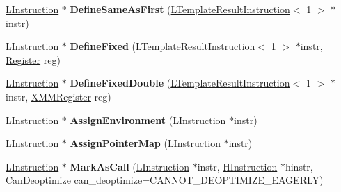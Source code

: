 \begin{DoxyCompactItemize}
\item 
\hyperlink{classv8_1_1internal_1_1_l_instruction}{L\+Instruction} $\ast$ {\bfseries Define\+Same\+As\+First} (\hyperlink{classv8_1_1internal_1_1_l_template_result_instruction}{L\+Template\+Result\+Instruction}$<$ 1 $>$ $\ast$instr)\hypertarget{classv8_1_1internal_1_1_l_chunk_builder_a7a3e6bb64466e8d0b7062311bc13455a}{}\label{classv8_1_1internal_1_1_l_chunk_builder_a7a3e6bb64466e8d0b7062311bc13455a}

\item 
\hyperlink{classv8_1_1internal_1_1_l_instruction}{L\+Instruction} $\ast$ {\bfseries Define\+Fixed} (\hyperlink{classv8_1_1internal_1_1_l_template_result_instruction}{L\+Template\+Result\+Instruction}$<$ 1 $>$ $\ast$instr, \hyperlink{structv8_1_1internal_1_1_register}{Register} reg)\hypertarget{classv8_1_1internal_1_1_l_chunk_builder_a7dfb72b4e8c8ed4fc4acb6c8ce207af9}{}\label{classv8_1_1internal_1_1_l_chunk_builder_a7dfb72b4e8c8ed4fc4acb6c8ce207af9}

\item 
\hyperlink{classv8_1_1internal_1_1_l_instruction}{L\+Instruction} $\ast$ {\bfseries Define\+Fixed\+Double} (\hyperlink{classv8_1_1internal_1_1_l_template_result_instruction}{L\+Template\+Result\+Instruction}$<$ 1 $>$ $\ast$instr, \hyperlink{structv8_1_1internal_1_1_double_register}{X\+M\+M\+Register} reg)\hypertarget{classv8_1_1internal_1_1_l_chunk_builder_a5b4a95fe2bd2cfba74c58d6c2a760d8c}{}\label{classv8_1_1internal_1_1_l_chunk_builder_a5b4a95fe2bd2cfba74c58d6c2a760d8c}

\item 
\hyperlink{classv8_1_1internal_1_1_l_instruction}{L\+Instruction} $\ast$ {\bfseries Assign\+Environment} (\hyperlink{classv8_1_1internal_1_1_l_instruction}{L\+Instruction} $\ast$instr)\hypertarget{classv8_1_1internal_1_1_l_chunk_builder_a57688ea94214122c105fd9dcb458067c}{}\label{classv8_1_1internal_1_1_l_chunk_builder_a57688ea94214122c105fd9dcb458067c}

\item 
\hyperlink{classv8_1_1internal_1_1_l_instruction}{L\+Instruction} $\ast$ {\bfseries Assign\+Pointer\+Map} (\hyperlink{classv8_1_1internal_1_1_l_instruction}{L\+Instruction} $\ast$instr)\hypertarget{classv8_1_1internal_1_1_l_chunk_builder_a310b14c9a7f420e8294d1180c8ea030b}{}\label{classv8_1_1internal_1_1_l_chunk_builder_a310b14c9a7f420e8294d1180c8ea030b}

\item 
\hyperlink{classv8_1_1internal_1_1_l_instruction}{L\+Instruction} $\ast$ {\bfseries Mark\+As\+Call} (\hyperlink{classv8_1_1internal_1_1_l_instruction}{L\+Instruction} $\ast$instr, \hyperlink{classv8_1_1internal_1_1_h_instruction}{H\+Instruction} $\ast$hinstr, Can\+Deoptimize can\+\_\+deoptimize=C\+A\+N\+N\+O\+T\+\_\+\+D\+E\+O\+P\+T\+I\+M\+I\+Z\+E\+\_\+\+E\+A\+G\+E\+R\+LY)\hypertarget{classv8_1_1internal_1_1_l_chunk_builder_af7d51aa993ccf0b54ae1599f1bc027d1}{}\label{classv8_1_1internal_1_1_l_chunk_builder_af7d51aa993ccf0b54ae1599f1bc027d1}


\end{DoxyCompactItemize}
